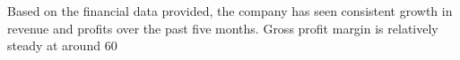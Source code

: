 

Based on the financial data provided, the company has seen consistent growth in revenue and profits over the past five months. Gross profit margin is relatively steady at around 60%